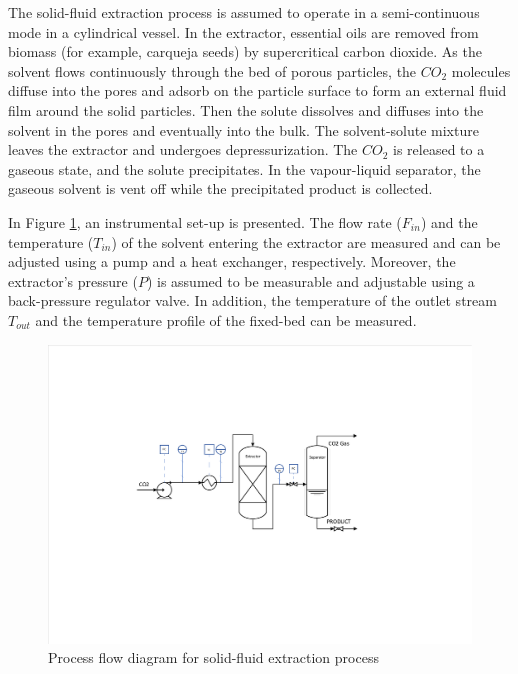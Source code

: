 \documentclass[a4paper,fleqn]{cas-dc}
\begin{document}
{\color{blue}The solid-fluid extraction process is assumed to operate in a semi-continuous mode in a cylindrical vessel. In the extractor, essential oils are removed from biomass (for example, carqueja seeds) by supercritical carbon dioxide. As the solvent flows continuously through the bed of porous particles, the $CO_2$ molecules diffuse into the pores and adsorb on the particle surface to form an external fluid film around the solid particles. Then the solute dissolves and diffuses into the solvent in the pores and eventually into the bulk. The solvent-solute mixture leaves the extractor and undergoes depressurization. The $CO_2$ is released to a gaseous state, and the solute precipitates. In the vapour-liquid separator, the gaseous solvent is vent off while the precipitated product is collected.

In Figure \ref{fig: SFE_drawing}, an instrumental set-up is presented. The flow rate ($F_{in}$) and the temperature ($T_{in}$) of the solvent entering the extractor are measured and can be adjusted using a pump and a heat exchanger, respectively. Moreover, the extractor's pressure ($P$) is assumed to be measurable and adjustable using a back-pressure regulator valve. In addition, the temperature of the outlet stream $T_{out}$ and the temperature profile of the fixed-bed can be measured. }

\begin{figure}[h]
	\centering
	\includegraphics[trim = 6cm 7.5cm 8cm 6cm, clip, width=\linewidth]{Figures/SFE_PFD.pdf}
	\caption{Process flow diagram for solid-fluid extraction process}
	\label{fig: SFE_drawing}
\end{figure}
\end{document}
